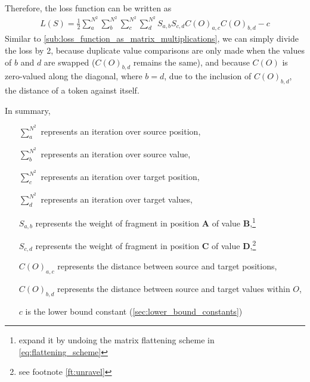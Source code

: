 Therefore, the loss function can be written as
\begin{align}
    L(S)=\frac{1}{2}\sum_{a}^{N^2} \sum_{b}^{N^2} \sum_{c}^{N^2} \sum_{d}^{N^2} S_{a,b} S_{c,d} C(O)_{a,c}C(O)_{b,d}-c
    \label{eq:final_loss}
\end{align}
Similar to \autoref{sub:loss_function_as_matrix_multiplications}, we can simply divide the loss by 2, because duplicate value comparisons are only made when the values of $b$ and $d$ are swapped ($C(O)_{b,d}$ remains the same), and because $C(O)$ is zero-valued along the diagonal, where $b=d$, due to the inclusion of $C(O)_{b,d}$, the distance of a token against itself.

In summary,
\begin{itemize}
    \item [$\sum_{a}^{N^2}$] represents an iteration over source position,
    \item [$\sum_{b}^{N^2}$] represents an iteration over source value,
    \item [$\sum_{c}^{N^2}$] represents an iteration over target position,
    \item [$\sum_{d}^{N^2}$] represents an iteration over target values,
    \item [$S_{a,b}$] represents the weight of fragment in position $\bm{A}$ of value $\bm{B}$,\footnote{\label{ft:unravel}expand it by undoing the matrix flattening scheme in \autoref{eq:flattening_scheme}}
    \item [$S_{c,d}$] represents the weight of fragment in position $\bm{C}$ of value $\bm{D}$,\footnote{see footnote \autoref{ft:unravel}}
    \item [$C(O)_{a,c}$] represents the distance between source and target positions,
    \item [$C(O)_{b,d}$] represents the distance between source and target values within $O$,
    \item [$c$] is the lower bound constant (\autoref{sec:lower_bound_constants})
\end{itemize}

